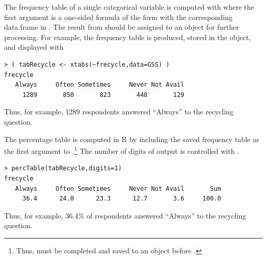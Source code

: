 \documentclass[10pt,openany]{book}\usepackage[]{graphicx}\usepackage[]{color}
\makeatletter
\newenvironment{kframe}{%
 \def\at@end@of@kframe{}%
 \ifinner\ifhmode%
  \def\at@end@of@kframe{\end{minipage}}%
  \begin{minipage}{\columnwidth}%
 \fi\fi%
 \def\FrameCommand##1{\hskip\@totalleftmargin \hskip-\fboxsep
 \colorbox{shadecolor}{##1}\hskip-\fboxsep
     \hskip-\linewidth \hskip-\@totalleftmargin \hskip\columnwidth}%
 \MakeFramed {\advance\hsize-\width
   \@totalleftmargin\z@ \linewidth\hsize
   \@setminipage}}%
 {\par\unskip\endMakeFramed%
 \at@end@of@kframe}
\newenvironment{knitrout}{}{} %
\makeatother
\begin{document}

\vspace{-12pt}

The frequency table of a single categorical variable is computed with  where the first argument is a one-sided formula of the form  with the corresponding data.frame in .  The result from  should be assigned to an object for further processing.  For example, the frequency table is produced, stored in the  object, and displayed with
\begin{knitrout}
\color{fgcolor}\begin{kframe}
\begin{verbatim}
> ( tabRecycle <- xtabs(~frecycle,data=GSS) )
frecycle
   Always     Often Sometimes     Never Not Avail 
     1289       850       823       448       129 
\end{verbatim}
\end{kframe}
\end{knitrout}
Thus, for example, 1289 respondents answered ``Always'' to the recycling question.

The percentage table is computed in R by including the saved frequency table as the first argument to .\footnote{Thus,  must be completed and saved to an object before .}  The number of digits of output is controlled with .
\begin{knitrout}
\color{fgcolor}\begin{kframe}
\begin{verbatim}
> percTable(tabRecycle,digits=1)
frecycle
   Always     Often Sometimes     Never Not Avail       Sum 
     36.4      24.0      23.3      12.7       3.6     100.0 
\end{verbatim}
\end{kframe}
\end{knitrout}
Thus, for example, 36.4\% of respondents answered ``Always'' to the recycling question.
\end{document}
